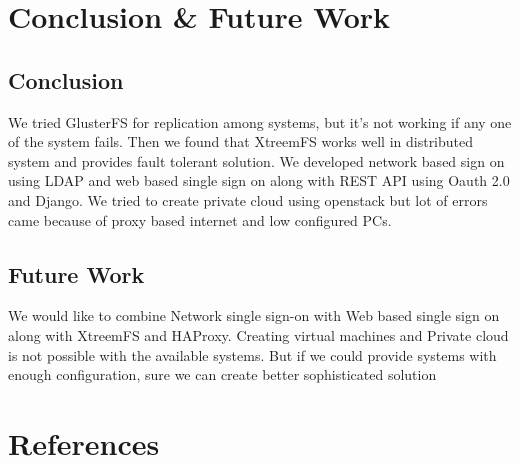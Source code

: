 \documentclass[12pt]{report}
\begin{document}
\chapter{Conclusion \& Future Work}
\section{Conclusion} 
We tried GlusterFS for replication among systems, but it’s not working if any one of the system fails. Then we found that XtreemFS works well in distributed system and provides fault tolerant solution. \newline
\underline{} \newline
We developed network based sign on using LDAP and web based single sign on along with REST API using Oauth 2.0 and Django. We tried to create private cloud using openstack but lot of errors came because of proxy based internet and low configured PCs.

\section{Future Work}
We would like to combine Network single sign-on with Web based single sign on along with XtreemFS and HAProxy. Creating virtual machines and Private cloud is not possible with the available systems. But if we could provide systems with enough configuration, sure we can create better sophisticated solution

\chapter{References}
\end{document}
